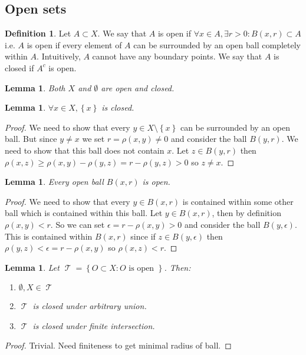 \documentclass{article}
\renewcommand\O{\ensuremath{\emptyset}}
\DeclareMathOperator{\T}{\mathcal{T}}
\newtheorem{lemma}[theorem]{Lemma}
\theoremstyle{definition}
\newtheorem{definition}{Definition}[subsection]
\theoremstyle{remark}
\theoremstyle{plain}
\begin{document}
\subsection{Open sets}

\begin{definition}
    Let \(A\subset X\). We say that \(A\) is open if \(\forall x \in A, \exists r > 0: B(x,r) \subset A\) i.e. \(A\) is open if every element of \(A\) can be surrounded by an open ball 
    completely within \(A\). Intuitively, \(A\) cannot have any boundary points. We say that \(A\) is closed if \(A^c\) is open. 
\end{definition}

\begin{lemma}
    Both \(X\) and \(\O\) are open and closed. 
\end{lemma}

\begin{lemma}
    \(\forall x \in X, \left\{ x \right\}\) is closed. 
\end{lemma}
\begin{proof}
    We need to show that every \(y \in X\setminus \left\{ x \right\}\) can be surrounded by an open ball. But since \(y \neq x\) we set 
    \(r = \rho(x,y) \neq 0\) and consider the ball \(B(y,r)\). We need to show that this ball does not contain \(x\). Let \(z \in B(y,r)\) then \(\rho(x,z) \geq \rho(x,y) - \rho(y,z) = r - \rho(y,z) > 0 \)
    so \(z \neq x\).
\end{proof}

\begin{lemma}
    Every open ball \(B(x,r)\) is open. 
\end{lemma}
\begin{proof}
    We need to show that every \(y \in B(x,r)\) is contained within some other ball which is contained within this ball. 
    Let \(y \in B(x,r)\), then by definition \(\rho(x,y) < r\). So we can set \(\epsilon = r - \rho(x,y) > 0\) and consider the ball
    \(B(y,\epsilon)\). This is contained within \(B(x,r)\) since if \(z \in B(y,\epsilon)\) then \(\rho(y,z) < \epsilon = r - \rho(x,y)\) so \(\rho(x,z) < r\). 
\end{proof}

\begin{lemma}
    Let \(\T = \left\{ O \subset X: O \text{ is open } \right\}\). Then:
    \begin{enumerate}
        \item \(\O, X \in \T\)
        \item \(\T\) is closed under arbitrary union.
        \item \(\T\) is closed under finite intersection.
    \end{enumerate}
\end{lemma}
\begin{proof}
    Trivial. Need finiteness to get minimal radius of ball. 
\end{proof}
\end{document}
